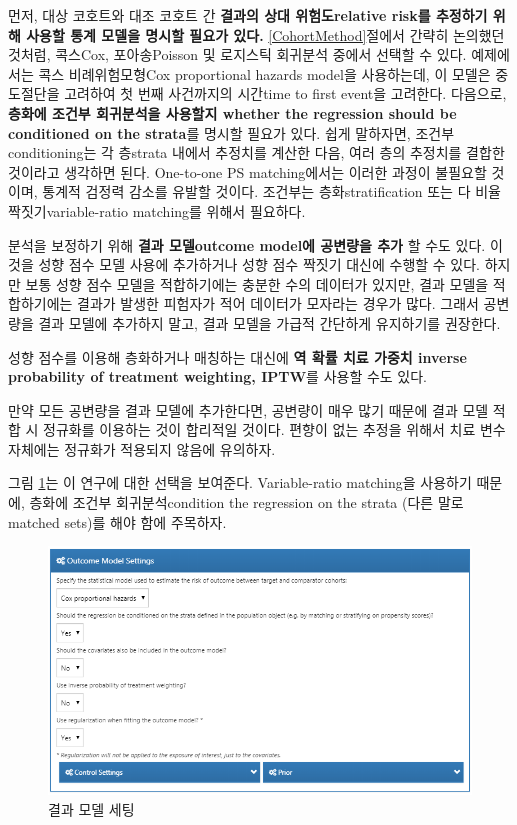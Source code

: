 \documentclass[10.5pt]{book}
\theoremstyle{definition}
\theoremstyle{definition}
\theoremstyle{definition}
\theoremstyle{remark}
\begin{document}
먼저, 대상 코호트와 대조 코호트 간 \textbf{결과의 상대 위험도relative
risk를 추정하기 위해 사용할 통계 모델을 명시할 필요가 있다.}
\ref{CohortMethod}절에서 간략히 논의했던 것처럼, 콕스Cox, 포아송Poisson
및 로지스틱 회귀분석 중에서 선택할 수 있다. 예제에서는 콕스
비례위험모형Cox proportional hazards model을 사용하는데, 이 모델은
중도절단을 고려하여 첫 번째 사건까지의 시간time to first event을
고려한다. 다음으로, \textbf{층화에 조건부 회귀분석을 사용할지 whether
the regression should be conditioned on the strata}를 명시할 필요가
있다. 쉽게 말하자면, 조건부 conditioning는 각 층strata 내에서 추정치를
계산한 다음, 여러 층의 추정치를 결합한 것이라고 생각하면 된다.
One-to-one PS matching에서는 이러한 과정이 불필요할 것이며, 통계적
검정력 감소를 유발할 것이다. 조건부는 층화stratification 또는 다 비율
짝짓기variable-ratio matching를 위해서 필요하다.

분석을 보정하기 위해 \textbf{결과 모델outcome model에 공변량을 추가} 할
수도 있다. 이것을 성향 점수 모델 사용에 추가하거나 성향 점수 짝짓기
대신에 수행할 수 있다. 하지만 보통 성향 점수 모델을 적합하기에는 충분한
수의 데이터가 있지만, 결과 모델을 적합하기에는 결과가 발생한 피험자가
적어 데이터가 모자라는 경우가 많다. 그래서 공변량을 결과 모델에 추가하지
말고, 결과 모델을 가급적 간단하게 유지하기를 권장한다.

성향 점수를 이용해 층화하거나 매칭하는 대신에 \textbf{역 확률 치료
가중치 inverse probability of treatment weighting, IPTW}를 사용할 수도
있다.

만약 모든 공변량을 결과 모델에 추가한다면, 공변량이 매우 많기 때문에
결과 모델 적합 시 정규화를 이용하는 것이 합리적일 것이다. 편향이 없는
추정을 위해서 치료 변수 자체에는 정규화가 적용되지 않음에 유의하자.

그림 \ref{fig:outcomeModelSettings}는 이 연구에 대한 선택을 보여준다.
Variable-ratio matching을 사용하기 때문에, 층화에 조건부
회귀분석condition the regression on the strata (다른 말로 matched
sets)를 해야 함에 주목하자.

\begin{figure}

{\centering \includegraphics[width=1\linewidth]{images/PopulationLevelEstimation/outcomeModelSettings} 

}

\caption{결과 모델 세팅}\label{fig:outcomeModelSettings}
\end{figure}
\end{document}
